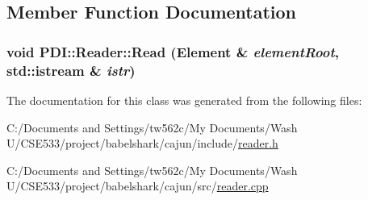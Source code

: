 \subsection{Member Function Documentation}
\hypertarget{class_p_d_i_1_1_reader_f4bd913b90e3e0c8e7c0b38579a0f357}{
\subsubsection[{Read}]{\setlength{\rightskip}{0pt plus 5cm}void PDI::Reader::Read ({\bf Element} \& {\em elementRoot}, \/  std::istream \& {\em istr})}}
\label{class_p_d_i_1_1_reader_f4bd913b90e3e0c8e7c0b38579a0f357}




The documentation for this class was generated from the following files:\begin{CompactItemize}
\item 
C:/Documents and Settings/tw562c/My Documents/Wash U/CSE533/project/babelshark/cajun/include/\hyperlink{reader_8h}{reader.h}\item 
C:/Documents and Settings/tw562c/My Documents/Wash U/CSE533/project/babelshark/cajun/src/\hyperlink{reader_8cpp}{reader.cpp}\end{CompactItemize}
